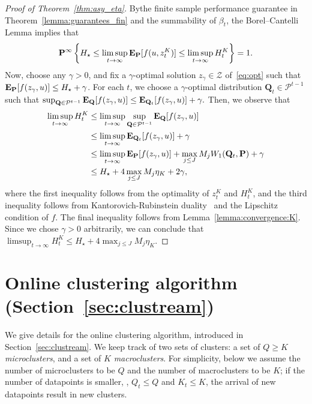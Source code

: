 \begin{proof}[Proof of Theorem~\ref{thm:asy_eta}]
Bythe finite sample performance guarantee in Theorem~\ref{lemma:guarantees_fin} and the summability of $\beta_t$, the Borel–Cantelli Lemma implies that $$ \mathbf{P}^\infty\left\{ H_\star \leq \limsup_{t \rightarrow \infty } \mathbf{E}_{\mathbf P}[f(u,z^K_{t})]\leq  \limsup_{t \rightarrow \infty } H^K_t\right\} = 1.$$
Now, choose any $\gamma >0$, and fix a $\gamma$-optimal solution $z_{\gamma} \in \mathcal{Z}$ of~\eqref{eq:opt} such that $\mathbf{E}_{{\mathbf P}}[f(z_{\gamma},u)] \leq H_\star + \gamma$. For each $t$, we choose a $\gamma$-optimal distribution $\mathbf{Q}_t \in \mathcal{P}^{t-1}$ such that $ \sup_{\mathbf{Q} \in \mathcal{P}^{t-1}}\mathbf{E}_{\mathbf{Q}}[f(z_{\gamma},u)] \leq \mathbf{E}_{\mathbf{Q}_t}[f(z_{\gamma},u)] + \gamma.$
Then, we observe that
\begin{equation*}
\begin{aligned}
    \limsup_{t \rightarrow \infty } H^K_t &\leq \limsup_{t \rightarrow \infty } \sup_{\mathbf{Q} \in \mathcal{P}^{t-1}}\mathbf{E}_{\mathbf{Q}}[f(z_{\gamma},u)]\\
    &\leq \limsup_{t \rightarrow \infty }\mathbf{E}_{\mathbf{Q}_t}[f(z_{\gamma},u)] + \gamma\\
     &\leq \limsup_{t \rightarrow \infty }\mathbf{E}_{\mathbf{{\mathbf P}}}[f(z_{\gamma},u)] + \max_{j\leq J}M_jW_1(\mathbf{Q}_t,{\mathbf P})+ \gamma\\
     &\leq H_\star + 4\max_{j\leq J}M_j\eta_K + 2\gamma,
\end{aligned}
\end{equation*}
where the first inequality follows from the optimality of $z^K_{t}$ and $H^K_t$, and the third inequality follows from Kantorovich-Rubinstein duality~\cite{kantorovich_duality} and the Lipschitz condition of $f$. The final inequality follows from Lemma~\ref{lemma:convergence:K}. Since we chose $\gamma > 0$ arbitrarily, we can conclude that
$\limsup_{t \rightarrow \infty } H^K_t \leq H_\star + 4\max_{j\leq J}M_j\eta_K $.
\end{proof}




\section{Online clustering algorithm (Section~\ref{sec:clustream})}
\label{app:onlinecluster}
We give details for the online clustering algorithm, introduced in Section~\ref{sec:clustream}.
We keep track of two sets of clusters: a set of $Q \geq K$ {\it microclusters}, and a set of $K$ {\it macroclusters}. 
For simplicity, below we assume the number of microclusters to be $Q$ and the number of macroclusters to be $K$; if the number of datapoints is smaller, \ie, $Q_t \leq Q$ and $K_t \leq K$, the arrival of new datapoints result in new clusters.

